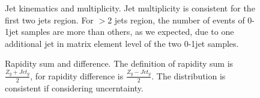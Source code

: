 \documentclass[12pt]{article} %
\begin{document}
\begin{figure}[H] %
  \caption{Jet kinematics and multiplicity. Jet multiplicity is consistent for the first two jets region. For $>$2 jets region, the number of events of 0-1jet samples are more than others, as we expected, due to one additional jet in matrix element level of the two 0-1jet samples.}
  \label{fig:MG5_Jet}
\end{figure}


\begin{figure}[H] %
  \caption{Rapidity sum and difference. The definition of rapidity sum is $\frac{Z_{y}+Jet_{y}}{2}$, for rapidity difference is $\frac{Z_{y}-Jet_{y}}{2}$. The distribution is consistent if considering uncerntainty.}
  \label{fig:MG5_Rap}
\end{figure}





\newpage
\end{document}
